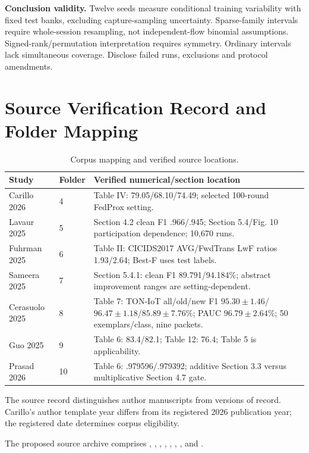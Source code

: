 \documentclass[10pt,a4paper]{article}
\begin{document}
\textbf{Conclusion validity.} Twelve seeds measure conditional training variability with fixed test banks, excluding capture-sampling uncertainty. Sparse-family intervals require whole-session resampling, not independent-flow binomial assumptions. Signed-rank/permutation interpretation requires symmetry. Ordinary intervals lack simultaneous coverage. Disclose failed runs, exclusions and protocol amendments.

\appendix
\section{Source Verification Record and Folder Mapping}
\label{app:sources}
\begin{table}[htbp]
\centering\footnotesize
\caption{Corpus mapping and verified source locations.}
\label{tab:mapping}
\begin{tabularx}{\linewidth}{L{2.4cm}L{1.0cm}Y}
\toprule
Study & Folder & Verified numerical/section location\\
\midrule
Carillo 2026 & 4 & Table IV: 79.05/68.10/74.49; selected 100-round FedProx setting.\\
Lavaur 2025 & 5 & Section 4.2 clean F1 .966/.945; Section 5.4/Fig. 10 participation dependence; 10,670 runs.\\
Fuhrman 2025 & 6 & Table II: CICIDS2017 AVG/FwdTrans LwF ratios 1.93/2.64; Best-F uses test labels.\\
Sameera 2025 & 7 & Section 5.4.1: clean F1 89.791/94.184\%; abstract improvement ranges are setting-dependent.\\
Cerasuolo 2025 & 8 & Table 7: TON-IoT all/old/new F1 $95.30\pm1.46$/$96.47\pm1.18$/$85.89\pm7.76$\%; PAUC $96.79\pm2.64$\%; 50 exemplars/class, nine packets.\\
Guo 2025 & 9 & Table 6: 83.4/82.1; Table 12: 76.4; Table 5 is applicability.\\
Prasad 2026 & 10 & Table 6: .979596/.979392; additive Section 3.3 versus multiplicative Section 4.7 gate.\\
\bottomrule
\end{tabularx}
\end{table}
The source record distinguishes author manuscripts from versions of record. Carillo's author template year differs from its registered 2026 publication year; the registered date determines corpus eligibility.

The proposed source archive comprises , , , , , , , and .
\end{document}
